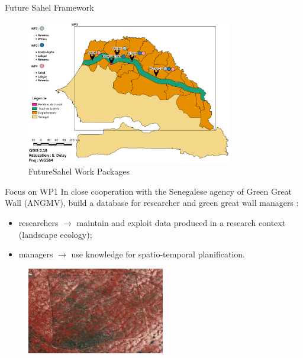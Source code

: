 \documentclass[newPxFont]{beamer}
\begin{document}
\begin{frame}[c]{Future Sahel Framework}
\vspace{-1cm}
\begin{figure}
	\centering
	\includegraphics[width = 0.8\textwidth]{img/Carte_FutureSahel}
	\caption{FutureSahel Work Packages}
\end{figure}
\end{frame}


\begin{frame}[c]{Focus on WP1}
\vspace{-1cm}
In close cooperation with the Senegalese agency of Green Great Wall (ANGMV), build a database for researcher and green great wall managers :
	\begin{itemize}
		\item researchers $\rightarrow$ maintain and exploit data produced in a research context (landscape ecology);
		\item managers $\rightarrow$ use knowledge for spatio-temporal planification.
	\end{itemize}
  \begin{figure}
  	\centering
  	\includegraphics[width = 6cm]{img/IR_spot}
  \end{figure}
\end{frame}
\end{document}
